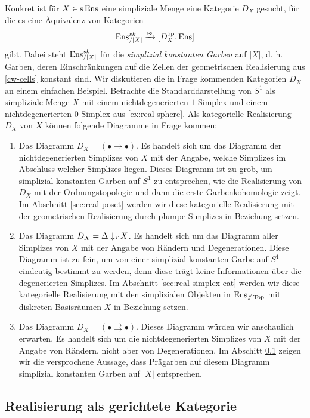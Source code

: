 Konkret ist für $X \in \operatorname{s}\operatorname{Ens}$ eine simpliziale Menge eine Kategorie
$D_X$ gesucht, für die es eine Äquivalenz von Kategorien
\[ \operatorname{Ens}_{/|X|}^{sk} \xrightarrow{\approx} {[D_X^\mathrm{op}, \operatorname{Ens}]} \]
gibt. Dabei steht $\operatorname{Ens}_{/|X|}^{sk}$ für die \emph{simplizial
  konstanten Garben} auf $|X|$, d. h. Garben, deren Einschränkungen
auf die Zellen der geometrischen Realisierung aus \ref{cw-cells}
konstant sind. Wir diskutieren die in Frage kommenden Kategorien $D_X$
an einem einfachen Beispiel. Betrachte die Standarddarstellung von
$S^1$ als simpliziale Menge $X$ mit einem nichtdegenerierten
$1$-Simplex und einem nichtdegenerierten $0$-Simplex aus
\ref{ex:real-sphere}. Als kategorielle Realisierung $D_X$ von $X$
können folgende Diagramme in Frage kommen:
\begin{enumerate}
\item Das Diagramm $D_X = (\bullet \to \bullet)$. Es handelt sich um
  das Diagramm der nichtdegenerierten Simplizes von $X$ mit der
  Angabe, welche Simplizes im Abschluss welcher Simplizes
  liegen. Dieses Diagramm ist zu grob, um simplizial konstanten Garben
  auf $S^1$ zu entsprechen, wie die Realisierung von $D_X$ mit der
  Ordnungstopologie und dann die erste Garbenkohomologie zeigt. Im
  Abschnitt \ref{sec:real-poset} werden wir diese kategorielle
  Realisierung mit der geometrischen Realisierung durch plumpe
  Simplizes in Beziehung setzen.
\item Das Diagramm $D_X = \Delta \downarrow \! {\scriptstyle r} \, X$. Es handelt sich um
  das Diagramm aller Simplizes von $X$ mit der Angabe von Rändern und
  Degenerationen. Diese Diagramm ist zu fein, um von einer simplizial
  konstanten Garbe auf $S^1$ eindeutig bestimmt zu werden, denn diese
  trägt keine Informationen über die degenerierten Simplizes. Im
  Abschnitt \ref{sec:real-simplex-cat} werden wir diese kategorielle
  Realisierung mit den simplizialen Objekten in $\operatorname{Ens}_{\mathbin{/\mkern-6mu/} \operatorname{Top}}$ mit
  diskreten Basisräumen $X$ in Beziehung setzen.
\item Das Diagramm $D_X = (\bullet \rightrightarrows \bullet)$. Dieses
  Diagramm würden wir anschaulich erwarten. Es handelt sich um die
  nichtdegenerierten Simplizes von $X$ mit der Angabe von Rändern,
  nicht aber von Degenerationen. Im Abschitt
  \ref{sec:real-directed-cat} zeigen wir die versprochene Aussage,
  dass Prägarben auf diesem Diagramm simplizial konstanten Garben auf
  $|X|$ entsprechen.
\end{enumerate}

\subsection{Realisierung als gerichtete Kategorie}
\label{sec:real-directed-cat}

